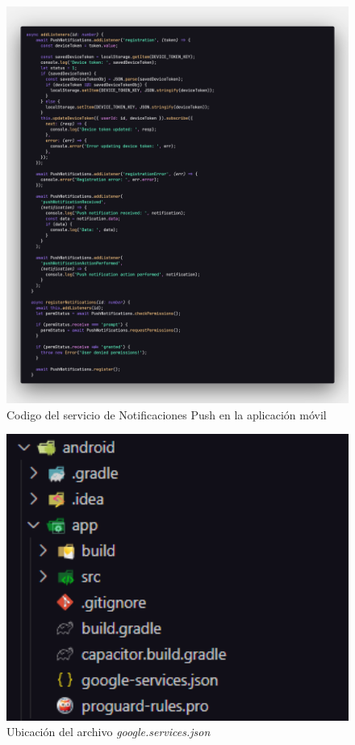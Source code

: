 \begin{figure}[H]
    \centering
    \includegraphics[width=1\textwidth]{resources/images/app-push}
    \caption{Codigo del servicio de Notificaciones Push en la aplicación móvil}
    \label{fig:app-push}
\end{figure}

\begin{figure}[H]
    \centering
    \includegraphics[width=1\textwidth]{resources/images/app-firebase-config}
    \caption{Ubicación del archivo \textit{google.services.json}}
    \label{fig:app-firebase-config}
\end{figure}

